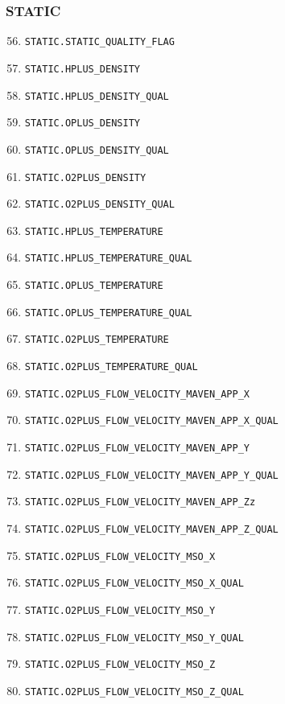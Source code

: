 \documentclass{article}
\begin{document}
\subsubsection{STATIC}
\begin{enumerate}
\setcounter{enumi}{55}
    \item \texttt{STATIC.STATIC\_QUALITY\_FLAG}
    \item \texttt{STATIC.HPLUS\_DENSITY}
    \item \texttt{STATIC.HPLUS\_DENSITY\_QUAL}
    \item \texttt{STATIC.OPLUS\_DENSITY}
    \item \texttt{STATIC.OPLUS\_DENSITY\_QUAL}
    \item \texttt{STATIC.O2PLUS\_DENSITY}
    \item \texttt{STATIC.O2PLUS\_DENSITY\_QUAL}
    \item \texttt{STATIC.HPLUS\_TEMPERATURE}
    \item \texttt{STATIC.HPLUS\_TEMPERATURE\_QUAL}
    \item \texttt{STATIC.OPLUS\_TEMPERATURE}
    \item \texttt{STATIC.OPLUS\_TEMPERATURE\_QUAL}
    \item \texttt{STATIC.O2PLUS\_TEMPERATURE}
    \item \texttt{STATIC.O2PLUS\_TEMPERATURE\_QUAL}
    \item \texttt{STATIC.O2PLUS\_FLOW\_VELOCITY\_MAVEN\_APP\_X}
    \item \texttt{STATIC.O2PLUS\_FLOW\_VELOCITY\_MAVEN\_APP\_X\_QUAL}
    \item \texttt{STATIC.O2PLUS\_FLOW\_VELOCITY\_MAVEN\_APP\_Y}
    \item \texttt{STATIC.O2PLUS\_FLOW\_VELOCITY\_MAVEN\_APP\_Y\_QUAL}
    \item \texttt{STATIC.O2PLUS\_FLOW\_VELOCITY\_MAVEN\_APP\_Zz}
    \item \texttt{STATIC.O2PLUS\_FLOW\_VELOCITY\_MAVEN\_APP\_Z\_QUAL}
    \item \texttt{STATIC.O2PLUS\_FLOW\_VELOCITY\_MSO\_X}
    \item \texttt{STATIC.O2PLUS\_FLOW\_VELOCITY\_MSO\_X\_QUAL}
    \item \texttt{STATIC.O2PLUS\_FLOW\_VELOCITY\_MSO\_Y}
    \item \texttt{STATIC.O2PLUS\_FLOW\_VELOCITY\_MSO\_Y\_QUAL}
    \item \texttt{STATIC.O2PLUS\_FLOW\_VELOCITY\_MSO\_Z}
    \item \texttt{STATIC.O2PLUS\_FLOW\_VELOCITY\_MSO\_Z\_QUAL}

\end{enumerate}
\end{document}
